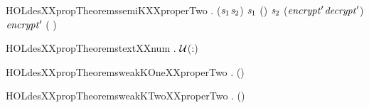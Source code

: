 \begin{SaveVerbatim}{HOLdesXXpropTheoremssemiKXXproperTwo}
\HOLTokenTurnstile{} \HOLSymConst{\HOLTokenForall{}} .
        \HOLSymConst{\HOLTokenConj{}}  \HOLSymConst{=} (\ensuremath{\HOLFreeVar{s}\sb{\mathrm{1}}}\HOLSymConst{,}\ensuremath{\HOLFreeVar{s}\sb{\mathrm{2}}}) \HOLSymConst{\HOLTokenConj{}}
      \ensuremath{\HOLFreeVar{s}\sb{\mathrm{1}}} \HOLSymConst{=} (\HOLSymConst{,}) \HOLSymConst{\HOLTokenConj{}}
      \ensuremath{\HOLFreeVar{s}\sb{\mathrm{2}}} \HOLSymConst{=} (\ensuremath{\HOLFreeVar{encrypt}\sp{\prime{}}}\HOLSymConst{,}\ensuremath{\HOLFreeVar{decrypt}\sp{\prime{}}}) \HOLSymConst{\HOLTokenImp{}}
     \ensuremath{\HOLFreeVar{encrypt}\sp{\prime{}}} ( ) \HOLSymConst{=} 
\end{SaveVerbatim}
\newcommand{\HOLdesXXpropTheoremssemiKXXproperTwo}{\UseVerbatim{HOLdesXXpropTheoremssemiKXXproperTwo}}
\begin{SaveVerbatim}{HOLdesXXpropTheoremstextXXnum}
\HOLTokenTurnstile{} \HOLSymConst{\HOLTokenForall{}}.    \HOLSymConst{\HOLTokenImp{}}   \HOLSymConst{=}  \ensuremath{{\cal{U}}}(:)
\end{SaveVerbatim}
\newcommand{\HOLdesXXpropTheoremstextXXnum}{\UseVerbatim{HOLdesXXpropTheoremstextXXnum}}
\begin{SaveVerbatim}{HOLdesXXpropTheoremsweakKOneXXproperTwo}
\HOLTokenTurnstile{} \HOLSymConst{\HOLTokenForall{}}.  \HOLConst{\HOLTokenIn{}}  \HOLSymConst{\HOLTokenConj{}}   \HOLSymConst{=} (\HOLSymConst{,}) \HOLSymConst{\HOLTokenImp{}}
         \HOLSymConst{=} 
\end{SaveVerbatim}
\newcommand{\HOLdesXXpropTheoremsweakKOneXXproperTwo}{\UseVerbatim{HOLdesXXpropTheoremsweakKOneXXproperTwo}}
\begin{SaveVerbatim}{HOLdesXXpropTheoremsweakKTwoXXproperTwo}
\HOLTokenTurnstile{} \HOLSymConst{\HOLTokenForall{}}.  \HOLConst{\HOLTokenIn{}}  \HOLSymConst{\HOLTokenConj{}}   \HOLSymConst{=} (\HOLSymConst{,}) \HOLSymConst{\HOLTokenImp{}}
         \HOLSymConst{=} 
\end{SaveVerbatim}
